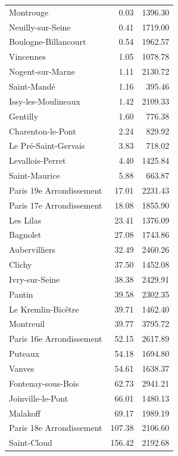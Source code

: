 \documentclass[12pt]{article}
\theoremstyle{plain}
\theoremstyle{remark}
\begin{document}
\begin{longtable}{lrr}
Montrouge               & 0.03   & 1396.30 \\
Neuilly-sur-Seine       & 0.41   & 1719.00 \\
Boulogne-Billancourt    & 0.54   & 1962.57 \\
Vincennes               & 1.05   & 1078.78 \\
Nogent-sur-Marne        & 1.11   & 2130.72 \\
Saint-Mandé             & 1.16   & 395.46  \\
Issy-les-Moulineaux     & 1.42   & 2109.33 \\
Gentilly                & 1.60   & 776.38  \\
Charenton-le-Pont       & 2.24   & 829.92  \\
Le Pré-Saint-Gervais    & 3.83   & 718.02  \\
Levallois-Perret        & 4.40   & 1425.84 \\
Saint-Maurice           & 5.88   & 663.87  \\
\midrule
Paris 19e Arrondissement & 17.01  & 2231.43 \\
Paris 17e Arrondissement & 18.08  & 1855.90 \\
Les Lilas               & 23.41  & 1376.09 \\
Bagnolet                & 27.08  & 1743.86 \\
Aubervilliers           & 32.49  & 2460.26 \\
Clichy                  & 37.50  & 1452.08 \\
Ivry-sur-Seine          & 38.38  & 2429.91 \\
Pantin                  & 39.58  & 2302.35 \\
Le Kremlin-Bicêtre      & 39.71  & 1462.40 \\
Montreuil               & 39.77  & 3795.72 \\
Paris 16e Arrondissement & 52.15  & 2617.89 \\
Puteaux                 & 54.18  & 1694.80 \\
Vanves                  & 54.61  & 1638.37 \\
Fontenay-sous-Bois      & 62.73  & 2941.21 \\
Joinville-le-Pont       & 66.01  & 1480.13 \\
Malakoff                & 69.17  & 1989.19 \\
\midrule
Paris 18e Arrondissement & 107.38 & 2106.60 \\
Saint-Cloud             & 156.42 & 2192.68 \\

\end{longtable}
\end{document}
